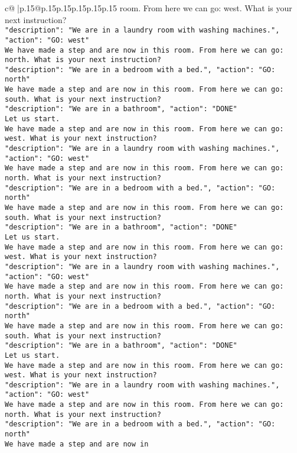 \documentclass{article}
\begin{document}
{\begin{supertabular}{c@{$\;$}|p{.15\linewidth}@{}p{.15\linewidth}p{.15\linewidth}p{.15\linewidth}p{.15\linewidth}p{.15\linewidth}}
{{{room. From here we can go: west. What is your next instruction?\\ \tt {"description": "We are in a laundry room with washing machines.", "action": "GO: west"}\\ \tt We have made a step and are now in this room. From here we can go: north. What is your next instruction?\\ \tt {"description": "We are in a bedroom with a bed.", "action": "GO: north"}\\ \tt We have made a step and are now in this room. From here we can go: south. What is your next instruction?\\ \tt {"description": "We are in a bathroom", "action": "DONE"}\\ \tt Let us start. \\ \tt We have made a step and are now in this room. From here we can go: west. What is your next instruction?\\ \tt {"description": "We are in a laundry room with washing machines.", "action": "GO: west"}\\ \tt We have made a step and are now in this room. From here we can go: north. What is your next instruction?\\ \tt {"description": "We are in a bedroom with a bed.", "action": "GO: north"}\\ \tt We have made a step and are now in this room. From here we can go: south. What is your next instruction?\\ \tt {"description": "We are in a bathroom", "action": "DONE"}\\ \tt Let us start. \\ \tt We have made a step and are now in this room. From here we can go: west. What is your next instruction?\\ \tt {"description": "We are in a laundry room with washing machines.", "action": "GO: west"}\\ \tt We have made a step and are now in this room. From here we can go: north. What is your next instruction?\\ \tt {"description": "We are in a bedroom with a bed.", "action": "GO: north"}\\ \tt We have made a step and are now in this room. From here we can go: south. What is your next instruction?\\ \tt {"description": "We are in a bathroom", "action": "DONE"}\\ \tt Let us start. \\ \tt We have made a step and are now in this room. From here we can go: west. What is your next instruction?\\ \tt {"description": "We are in a laundry room with washing machines.", "action": "GO: west"}\\ \tt We have made a step and are now in this room. From here we can go: north. What is your next instruction?\\ \tt {"description": "We are in a bedroom with a bed.", "action": "GO: north"}\\ \tt We have made a step and are now in 
}}}
\end{supertabular}}
\end{document}
